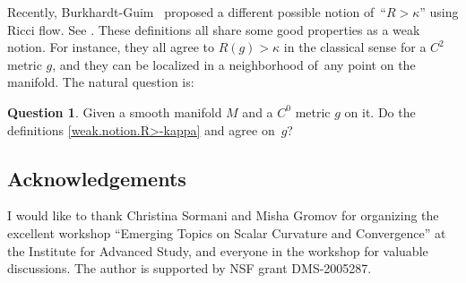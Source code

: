 \documentclass[10pt,a4paper]{amsart}
\numberwithin{equation}{section}
\theoremstyle{definition}
\newtheorem{quest}[prop]{Question}
\begin{document}
Recently, Burkhardt-Guim~\cite{burkhardt-guim2019pointwise} proposed a different possible notion of~``$R>\kappa$'' using Ricci flow. See \cite[Definition~1.2]{burkhardt-guim2019pointwise}. These definitions all share some good properties as a weak notion. For instance, they all agree to $R(g)>\kappa$ in the classical sense for a $C^2$ metric $g$, and they can be localized in a neighborhood of~any point on the manifold. The natural question is:

\begin{quest}\label{question.different.definitions}
Given a smooth manifold $M$ and a $C^0$ metric $g$ on it. Do the definitions \eqref{weak.notion.R>-kappa} and \cite[Definition~1.2]{burkhardt-guim2019pointwise} agree on~$g$?
\end{quest}

\subsection*{Acknowledgements}

I would like to thank Christina Sormani and Misha Gromov for organizing the excellent workshop ``Emerging Topics on Scalar Curvature and Convergence'' at the Institute for Advanced Study, and everyone in the workshop for valuable discussions. The author is supported by NSF grant DMS-2005287.

\end{document}
